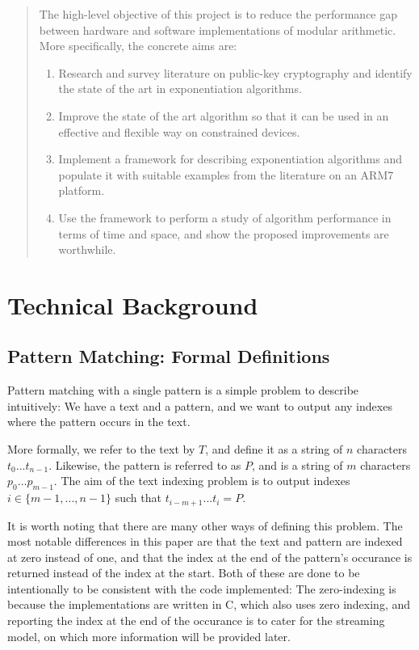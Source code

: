 \documentclass[ %
                    author={Dominic Joseph Moylett},
                supervisor={Dr. Raphael Clifford and Dr. Benjamin Sach},
                    degree={MEng},
                     title={Dictionary Matching with Fingerprints},
                  subtitle={An Empirical Analysis},
                      type={Research},
                      year={2014} ]{dissertation}
\begin{document}
\begin{quote}
\noindent
The high-level objective of this project is to reduce the performance 
gap between hardware and software implementations of modular arithmetic.  
More specifically, the concrete aims are:

\begin{enumerate}
\item Research and survey literature on public-key cryptography and
      identify the state of the art in exponentiation algorithms.
\item Improve the state of the art algorithm so that it can be used
      in an effective and flexible way on constrained devices.
\item Implement a framework for describing exponentiation algorithms
      and populate it with suitable examples from the literature on 
      an ARM7 platform.
\item Use the framework to perform a study of algorithm performance
      in terms of time and space, and show the proposed improvements
      are worthwhile.
\end{enumerate}
\end{quote}


\chapter{Technical Background}
\label{chap:technical}

\section{Pattern Matching: Formal Definitions}

\noindent
Pattern matching with a single pattern is a simple problem to describe intuitively: We have a text and a pattern, and we want to output any indexes where the pattern occurs in the text.

More formally, we refer to the text by $T$, and define it as a string of $n$ characters $t_0...t_{n-1}$. Likewise, the pattern is referred to as $P$, and is a string of $m$ characters $p_0...p_{m-1}$. The aim of the text indexing problem is to output indexes $i \in \{m-1,...,n-1\}$ such that $t_{i-m+1}...t_{i} = P$.

It is worth noting that there are many other ways of defining this problem. The most notable differences in this paper are that the text and pattern are indexed at zero instead of one, and that the index at the end of the pattern's occurance is returned instead of the index at the start. Both of these are done to be intentionally to be consistent with the code implemented: The zero-indexing is because the implementations are written in C, which also uses zero indexing, and reporting the index at the end of the occurance is to cater for the streaming model, on which more information will be provided later.
\end{document}
